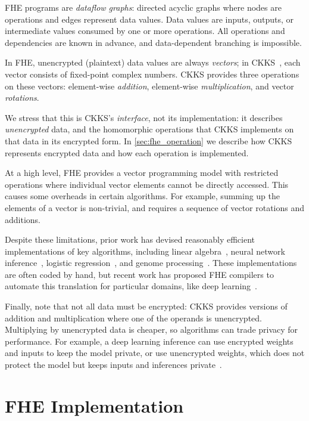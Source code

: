 FHE programs are \emph{dataflow graphs}: directed acyclic graphs where nodes
are operations and edges represent data values. Data values are inputs,
outputs, or intermediate values consumed by one or more operations. All
operations and dependencies are known in advance, and data-dependent branching
is impossible.

In FHE, unencrypted (plaintext) data values are always \emph{vectors}; in
CKKS~\cite{brakerski:toct14:leveled}, each vector consists of fixed-point
complex numbers. CKKS provides three operations on these vectors: element-wise
\emph{addition}, element-wise \emph{multiplication}, and vector
\emph{rotations}.

We stress that this is CKKS's \emph{interface}, not its implementation: it
describes \emph{unencrypted} data, and the homomorphic operations that CKKS
implements on that data in its encrypted form.  In \autoref{sec:fhe_operation}
we describe how CKKS represents encrypted data and how each operation is
implemented.

At a high level, FHE provides a vector programming model with restricted
operations where individual vector elements cannot be directly accessed.  This
causes some overheads in certain algorithms. For example, summing up the
elements of a vector is non-trivial, and requires a sequence of vector
rotations and additions.

Despite these limitations, prior work has devised reasonably efficient
implementations of key algorithms, including linear
algebra~\cite{halevi:crypto14:algorithms}, neural network
inference~\cite{brutzkus:icml19:low, gilad:icml16:cryptonets}, logistic
regression~\cite{han:iacr18:efficient}, and genome
processing~\cite{blatt:nas20:secure}. These implementations are often coded by
hand, but recent work has proposed FHE compilers to automate this translation
for particular domains, like deep
learning~\cite{dathathri:pldi19:chet,dathathri:pldi20:eva}.

Finally, note that not all data must be encrypted: CKKS provides versions of
addition and multiplication where one of the operands is unencrypted.
Multiplying by unencrypted data is cheaper, so algorithms can trade privacy for
performance. For example, a deep learning inference can use encrypted weights
and inputs to keep the model private, or use unencrypted weights, which does
not protect the model but keeps inputs and inferences
private~\cite{brutzkus:icml19:low}.

\section{FHE Implementation}
\label{sec:fhe_operation}

